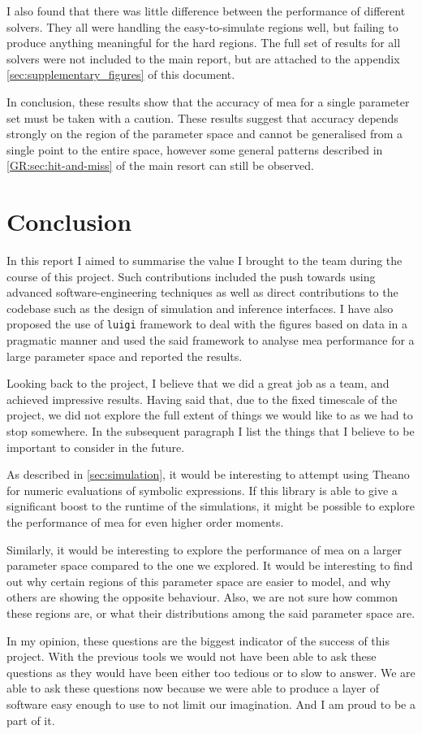 I also found that there was little difference between the performance of different solvers. They all were handling the easy-to-simulate regions well, but failing to produce anything meaningful for the hard regions.
The full set of results for all solvers were not included to the main report, but are attached to the appendix \autoref{sec:supplementary_figures} of this document.

In conclusion, these results show that the accuracy of \gls{mea} for a single parameter set must be taken with a caution. These results suggest that accuracy depends strongly on the region of the parameter space and cannot be generalised from a single point to the entire space, however some general patterns described in \autoref*{GR:sec:hit-and-miss} of the main resort can still be observed.

\section{Conclusion}

In this report I aimed to summarise the value I brought to the team during the course of this project.
Such contributions included the push towards using advanced software-engineering techniques as well as direct contributions to the codebase such as the design of simulation and inference interfaces.
I have also proposed the use of \verb"luigi" framework to deal with the figures based on data in a pragmatic manner and used the said framework to analyse \gls{mea} performance for a large parameter space and reported the results.

Looking back to the project, I believe that we did a great job as a team, and achieved impressive results.
Having said that, due to the fixed timescale of the project, we did not explore the full extent of things we would like to as we had to stop somewhere. In the subsequent paragraph I list the things that I believe to be important to consider in the future.

As described in \autoref{sec:simulation}, it would be interesting to attempt using Theano for numeric evaluations of symbolic expressions.
If this library is able to give a significant boost to the runtime of the simulations, it might be possible to explore the performance of \gls{mea} for even higher order moments. 

Similarly, it would be interesting to explore the performance of \gls{mea} on a larger parameter space compared to the one we explored.
It would be interesting to find out why certain regions of this parameter space are easier to model, and why others are showing the opposite behaviour. Also, we are not sure how common these regions are, or what their distributions among the said parameter space are.

In my opinion, these questions are the biggest indicator of the success of this project. 
With the previous tools we would not have been able to ask these questions as they would have been either too tedious or to slow to answer. We are able to ask these questions now because we were able to produce a layer of software easy enough to use to not limit our imagination. And I am proud to be a part of it.
